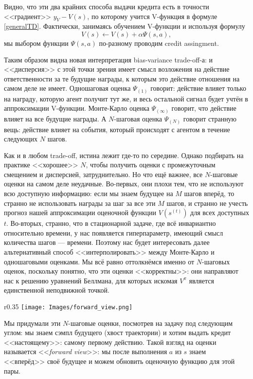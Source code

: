Видно, что эти два крайних способа выдачи кредита есть в точности <<градиент>> $y_V - V(s)$, по которому учится V-функция в формуле \eqref{generalTD}. Фактически, занимаясь обучением V-функции и используя формулу
\begin{equation*}
V(s) \leftarrow V(s) + \alpha \Psi(s, a),
\end{equation*}
мы выбором функции $\Psi(s, a)$ по-разному проводим credit assingment. 

Таким образом видна новая интерпретация bias-variance trade-off-а: и <<дисперсия>> с этой точки зрения имеет смысл возложения на действие ответственности за те будущие награды, к которым это действие отношения на самом деле не имеет. Одношаговая оценка $\Psi_{(1)}$ говорит: действие влияет только на награду, которую агент получит тут же, и весь остальной сигнал будет учтён в аппроксимации V-функции. Монте-Карло оценка $\Psi_{(\infty)}$ говорит, что действие влияет на все будущие награды. А $N$-шаговая оценка $\Psi_{(N)}$ говорит странную вещь: действие влияет на события, который происходят с агентом в течение следующих $N$ шагов.

Как и в любом trade-off, истина лежит где-то по середине. Однако подбирать на практике <<хорошее>> $N$, чтобы получить оценки с промежуточным смещением и дисперсией, затруднительно. Но что ещё важнее, все $N$-шаговые оценки на самом деле неудачные. Во-первых, они плохи тем, что не используют всю доступную информацию: если мы знаем будущее на $M$ шагов вперёд, то странно не использовать награды за шаг за все эти $M$ шагов, и странно не учесть прогноз нашей аппроксимации оценочной функции $V(s^{(t)})$ для всех доступных $t$. Во-вторых, странно, что в стационарной задаче, где всё инвариантно относительно времени, у нас появляется гиперпараметр, имеющий смысл количества шагов --- времени. Поэтому нас будет интересовать далее альтернативный способ <<интерполировать>> между Монте-Карло и одношаговыми оценками. Мы всё равно оттолкнёмся именно от $N$-шаговых оценок, поскольку понятно, что эти оценки <<корректны>>: они направляют нас к решению уравнений Беллмана, для которых искомая $V^\pi$ является единственной неподвижной точкой.

\begin{wrapfigure}{r}{0.35\textwidth}
\centering
\texttt{[image: Images/forward\_view.png]}
\vspace{-0.5cm}
\end{wrapfigure}
Мы придумали эти $N$-шаговые оценки, посмотрев на задачу под следующим углом: мы знаем сэмпл будущего (хвост траектории) и хотим выдать кредит <<настоящему>>: самому первому действию. Такой взгляд на оценки называется <<\emph{forward view}>>: мы после выполнения $a$ из $s$ знаем <<вперёд>> своё будущее и можем обновить оценочную функцию для этой пары.

